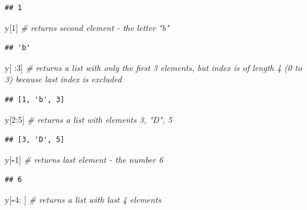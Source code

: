 \documentclass[
]{book}
\newenvironment{Shaded}{\begin{snugshade}}{\end{snugshade}}
\newcommand{\CommentTok}[1]{\textcolor[rgb]{0.56,0.35,0.01}{\textit{#1}}}
\newcommand{\DecValTok}[1]{\textcolor[rgb]{0.00,0.00,0.81}{#1}}
\newcommand{\NormalTok}[1]{#1}
\newcommand{\OperatorTok}[1]{\textcolor[rgb]{0.81,0.36,0.00}{\textbf{#1}}}
\begin{document}
\begin{verbatim}
## 1
\end{verbatim}

\begin{Shaded}
\begin{Highlighting}[]
\NormalTok{y[}\DecValTok{1}\NormalTok{] }\CommentTok{\# returns second element {-} the letter "b"}
\end{Highlighting}
\end{Shaded}

\begin{verbatim}
## 'b'
\end{verbatim}

\begin{Shaded}
\begin{Highlighting}[]
\NormalTok{y[ :}\DecValTok{3}\NormalTok{] }\CommentTok{\# returns a list with only the first 3 elements, but index is of length 4 (0 to 3) because last index is excluded}
\end{Highlighting}
\end{Shaded}

\begin{verbatim}
## [1, 'b', 3]
\end{verbatim}

\begin{Shaded}
\begin{Highlighting}[]
\NormalTok{y[}\DecValTok{2}\NormalTok{:}\DecValTok{5}\NormalTok{] }\CommentTok{\# returns a list with elements 3, "D", 5}
\end{Highlighting}
\end{Shaded}

\begin{verbatim}
## [3, 'D', 5]
\end{verbatim}

\begin{Shaded}
\begin{Highlighting}[]
\NormalTok{y[}\OperatorTok{{-}}\DecValTok{1}\NormalTok{] }\CommentTok{\# returns last element {-} the number 6 }
\end{Highlighting}
\end{Shaded}

\begin{verbatim}
## 6
\end{verbatim}

\begin{Shaded}
\begin{Highlighting}[]
\NormalTok{y[}\OperatorTok{{-}}\DecValTok{4}\NormalTok{: ] }\CommentTok{\# returns a list with last 4 elements}
\end{Highlighting}
\end{Shaded}
\end{document}
